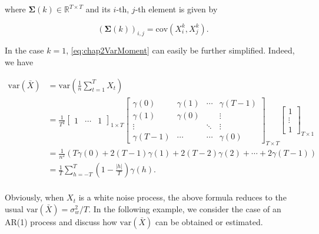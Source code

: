 \documentclass[]{book}
\theoremstyle{definition}
\theoremstyle{definition}
\theoremstyle{definition}
\theoremstyle{remark}
\begin{document}
where \(\boldsymbol{\Sigma}(k) \in \mathbb{R}^{T \times T}\) and its
\(i\)-th, \(j\)-th element is given by

\[ \left(\boldsymbol{\Sigma}(k)\right)_{i,j} = \text{cov} \left(X_i^k, X_j^k\right).\]

In the case \(k = 1\), \eqref{eq:chap2VarMoment} can easily be further
simplified. Indeed, we have

\[\begin{aligned}
       \text{var} \left( {\bar X} \right) &= \text{var} \left( {\frac{1}{n}\sum\limits_{t = 1}^T {{X_t}} } \right)  \\
       &= \frac{1}{{{T^2}}}{\left[ {\begin{array}{*{20}{c}}
         1& \cdots &1
         \end{array}} \right]_{1 \times T}}\left[ {\begin{array}{*{20}{c}}
           {\gamma \left( 0 \right)}&{\gamma \left( 1 \right)}& \cdots &{\gamma \left( {T - 1} \right)} \\
           {\gamma \left( 1 \right)}&{\gamma \left( 0 \right)}&{}& \vdots  \\
           \vdots &{}& \ddots & \vdots  \\
           {\gamma \left( {T - 1} \right)}& \cdots & \cdots &{\gamma \left( 0 \right)}
           \end{array}} \right]_{T \times T}{\left[ {\begin{array}{*{20}{c}}
             1 \\
             \vdots  \\
             1
             \end{array}} \right]_{T \times 1}}  \\
       &= \frac{1}{{{n^2}}}\left( {T\gamma \left( 0 \right) + 2\left( {T - 1} \right)\gamma \left( 1 \right) + 2\left( {T - 2} \right)\gamma \left( 2 \right) +  \cdots  + 2\gamma \left( {T - 1} \right)} \right)  \\
       &= \frac{1}{T}\sum\limits_{h =  - T}^T {\left( {1 - \frac{{\left| h \right|}}{T}} \right)\gamma \left( h \right)} .  \\
\end{aligned} \]

Obviously, when \(X_t\) is a white noise process, the above formula
reduces to the usual
\(\text{var} \left( {\bar X} \right) = \sigma^2_w/T\). In the following
example, we consider the case of an AR(1) process and discuss how
\(\text{var} \left( {\bar X} \right)\) can be obtained or estimated.
\end{document}
